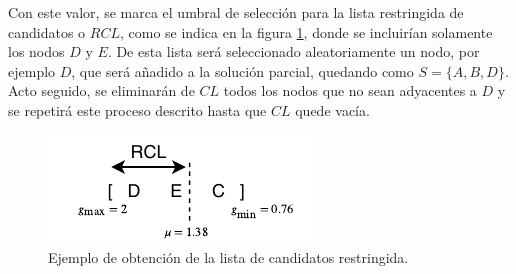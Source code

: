 Con este valor, se marca el umbral de selección para la lista restringida de candidatos o $RCL$, como se indica en la figura \ref{fig:const:rlc}, donde se incluirían solamente los nodos $D$ y $E$. De esta lista será seleccionado aleatoriamente un nodo, por ejemplo $D$, que será añadido a la solución parcial, quedando como $S = \{A, B, D\}$. Acto seguido, se eliminarán de $CL$ todos los nodos que no sean adyacentes a $D$ y se repetirá este proceso descrito hasta que $CL$ quede vacía.

\begin{figure}[H]
	\centering
	\includegraphics[scale=2]{Figures/proc-const/rcl.pdf}
	\caption{\footnotesize Ejemplo de obtención de la lista de candidatos restringida.}
	\label{fig:const:rlc}
\end{figure}

%
%

